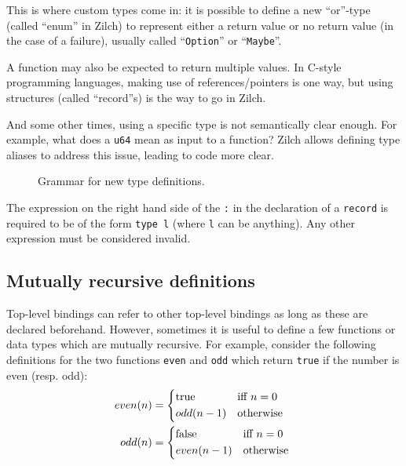 \noindent This is where custom types come in: it is possible to define a new ``or''-type (called ``enum'' in Zilch) to represent either a return value or no return value (in the case of a failure), usually called ``\texttt{Option}'' or ``\texttt{Maybe}''.

A function may also be expected to return multiple values.
In C-style programming languages, making use of references/pointers is one way, but using structures (called ``record''s) is the way to go in Zilch.

And some other times, using a specific type is not semantically clear enough.
For example, what does a \texttt{u64} mean as input to a function?
Zilch allows defining type aliases to address this issue, leading to code more clear.

\begin{figure}[H]
	\centering


	\caption{Grammar for new type definitions.}
	\label{fig:zilch-grammar-declarations-type-grammar}
\end{figure}

\begin{warningbox}
	The expression on the right hand side of the \texttt{:} in the declaration of a \texttt{record} is required to be of the form \texttt{type l} (where \texttt{l} can be anything).
	Any other expression must be considered invalid.
\end{warningbox}

\subsection{Mutually recursive definitions}\label{subsec:zilch-grammar-declarations-mutual}

Top-level bindings can refer to other top-level bindings as long as these are declared beforehand.
However, sometimes it is useful to define a few functions or data types which are mutually recursive.
For example, consider the following definitions for the two functions \texttt{even} and \texttt{odd} which return \texttt{true} if the number is even (resp. odd):
\begin{align*}
	even(n) & = \begin{cases*}
		            \mathrm{true} & iff $n = 0$ \\
		            odd(n - 1)    & otherwise
	            \end{cases*}  \\
	odd(n)  & = \begin{cases*}
		            \mathrm{false} & iff $n = 0$ \\
		            even(n - 1)    & otherwise
	            \end{cases*}
\end{align*}

